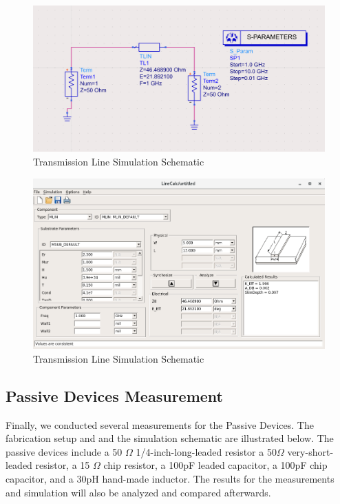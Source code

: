 \documentclass{article}
\begin{document}
\begin{figure}[H]
    \centering
    \includegraphics[width = 0.8\linewidth]{figures/schematic.PNG}
    \caption{Transmission Line Simulation Schematic}
\end{figure}

\begin{figure}[H]
    \centering
    \includegraphics[width = 0.8\linewidth]{figures/linecalc.png}
    \caption{Transmission Line Simulation Schematic}
\end{figure}

\subsection{Passive Devices Measurement}

\begin{flushleft}

Finally, we conducted several measurements for the Passive Devices. The 
fabrication setup and and the simulation schematic are illustrated below. The passive devices include a 50 $\Omega$ 1/4-inch-long-leaded resistor a 50$\Omega$ very-short-leaded resistor, a 15 $\Omega$ chip resistor, a 100pF leaded capacitor, a 100pF chip capacitor, and a 30pH hand-made inductor.  The results for the measurements and simulation will also be analyzed and compared afterwards.
\end{flushleft}
\end{document}
